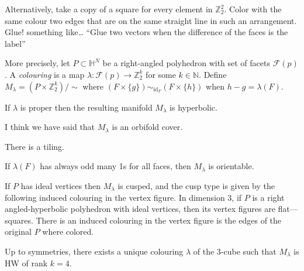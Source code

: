 Alternatively, take a copy of a square for
every element in $\mathbb{Z}_2^2$. Color with
the same colour two edges that are on the
same straight line in such an arrangement.
Glue! something like…
``Glue two vectors when
the difference of the faces is the label''

More precisely, let $P \subset \mathbb{H}^N$
be a right-angled polyhedron with set of
facets $\mathcal{F}(p)$. A \textit{colouring}
is a map $\lambda:\mathcal{F}(p) \to
\mathbb{Z}^k_2$ for some $k \in \mathbb{N}$.
Define $M_\lambda = (P \times
\mathbb{Z}_2^k)/\sim$ where $(F\times \{
g\})\sim_{\operatorname{id}_F} (F\times \{
h\})$ when $h-g=\lambda(F)$.

\begin{proposition}
\label{proposition-ferrari-davis-jan}
If $\lambda$ is proper then the resulting
manifold $M_\lambda$ is hyperbolic.
\end{proposition}

\begin{remark}
\label{remark-ferrari-orbifold-cover}
I think we have said that $M_\lambda$ is an
orbifold cover.
\end{remark}

\begin{remark}[Misha]
\label{remark-ferrari-misha-tiling}
There is a tiling.
\end{remark}

\begin{proposition}
\label{proposition-ferrari-orientable}
If $\lambda(F)$ has always odd many 1s for
all faces, then $M_\lambda$ is orientable.
\end{proposition}

\begin{proposition}
\label{proposition-ferrari-cusp-type}
If $P$ has ideal vertices then $M_\lambda$ is
cusped, and the cusp type is given by the
following induced colouring in the vertex
figure. In dimension 3, if $P$ is a right
angled-hyperbolic polyhedron with ideal
vertices, then its vertex figures are
flat---squares. There is an induced colouring
in the vertex figure is the edges of the
original $P$ where colored.
\end{proposition}

\begin{proposition}
\label{proposition-ferrari-cube-hw}
Up to symmetries, there exists a unique
colouring $\lambda$ of the 3-cube such that
$M_\lambda$ is HW of rank $k=4$.
\end{proposition}

